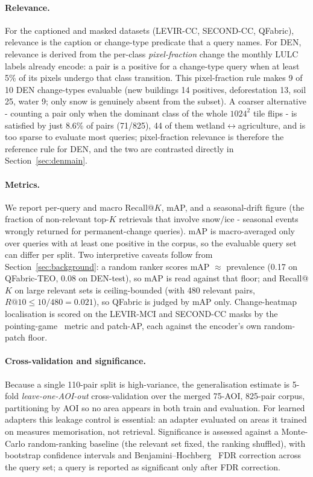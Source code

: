 \documentclass{article}
\begin{document}
\paragraph{Relevance.}
For the captioned and masked datasets (LEVIR-CC, SECOND-CC, QFabric), relevance
is the caption or change-type predicate that a query names. For DEN, relevance is
derived from the per-class \emph{pixel-fraction} change the monthly LULC labels
already encode: a pair is a positive for a change-type query when at least 5\% of
its pixels undergo that class transition. This pixel-fraction rule makes 9 of 10
DEN change-types evaluable (new buildings 14 positives, deforestation 13, soil
25, water 9; only snow is genuinely absent from the subset). A coarser
alternative - counting a pair only when the dominant class of the whole
$1024^2$ tile flips - is satisfied by just 8.6\% of pairs (71/825), 44 of them
wetland$\leftrightarrow$agriculture, and is too sparse to evaluate most queries;
pixel-fraction relevance is therefore the reference rule for DEN, and the two are
contrasted directly in Section~\ref{sec:denmain}.

\paragraph{Metrics.}
We report per-query and macro Recall@$K$, mAP, and a seasonal-drift figure (the
fraction of non-relevant top-$K$ retrievals that involve snow/ice - seasonal
events wrongly returned for permanent-change queries). mAP is macro-averaged only
over queries with at least one positive in the corpus, so the evaluable query set
can differ per split. Two interpretive caveats follow from
Section~\ref{sec:background}: a random ranker scores mAP $\approx$ prevalence
(0.17 on QFabric-TEO, 0.08 on DEN-test), so mAP is read against that floor; and
Recall@$K$ on large relevant sets is ceiling-bounded (with 480 relevant pairs,
$R@10 \le 10/480 = 0.021$), so QFabric is judged by mAP only. Change-heatmap
localisation is scored on the LEVIR-MCI and SECOND-CC masks by the
pointing-game~\cite{pointinggame} metric and patch-AP, each against the encoder's
own random-patch floor.

\paragraph{Cross-validation and significance.}
Because a single 110-pair split is high-variance, the generalisation estimate is
5-fold \emph{leave-one-AOI-out} cross-validation over the merged 75-AOI,
825-pair corpus, partitioning by AOI so no area appears in both train and
evaluation. For learned adapters this leakage control is essential: an adapter
evaluated on areas it trained on measures memorisation, not retrieval.
Significance is assessed against a Monte-Carlo random-ranking baseline (the
relevant set fixed, the ranking shuffled), with bootstrap confidence intervals
and Benjamini--Hochberg~\cite{benjaminihochberg} FDR correction across the query
set; a query is reported as significant only after FDR correction.
\end{document}
